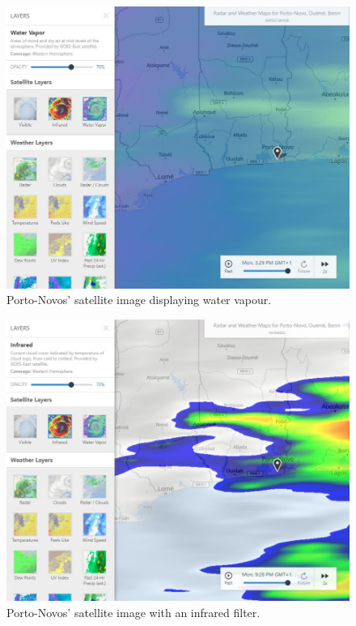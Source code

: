 %
\begin{figure}[b!]
    \centering
    \includegraphics[scale=0.6]{images/water_vapor.JPG}
    \caption{Porto-Novos' satellite image displaying water vapour.}
    \label{fig:vapour}
\end{figure}
\begin{figure}[b!]
    \centering
    \includegraphics[scale=0.6]{images/infrared.JPG}
    \caption{Porto-Novos' satellite image with an infrared filter.}
    \label{fig:filter}
\end{figure}
\clearpage

